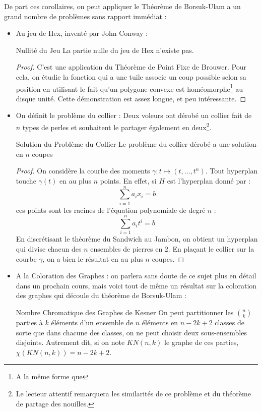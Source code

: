 \documentclass{cours}
\begin{document}
De part ces corollaires, on peut appliquer le Théorème de Borsuk-Ulam a un grand nombre de problèmes sans rapport immédiat\! :
\begin{itemize}
\item Au jeu de Hex, inventé par John Conway\! :
\begin{théorème}{Nullité du Jeu}{}
La partie nulle du jeu de Hex n'existe pas.
\end{théorème}
\begin{proof}
    C'est une application du Théorème de Point Fixe de Brouwer. Pour cela, on étudie la fonction qui a une tuile associe un coup possible selon sa position en utilisant le fait qu'un polygone convexe est homéomorphe\footnote{A la même forme que} au disque unité. Cette démonstration est assez longue, et peu intéressante.
\end{proof}
\item On définit le problème du collier\! : Deux voleurs ont dérobé un collier fait de $n$ types de perles et souhaitent le partager également en deux\footnote{Le lecteur attentif remarquera les similarités de ce problème et du théorème de partage des nouilles.}.
\begin{théorème}{Solution du Problème du Collier}{}
Le problème du collier dérobé a une solution en $n$ coupes
\end{théorème}
\begin{proof}
    On considère la courbe des moments $\gamma\! : t \mapsto \left(t, \ldots, t^{n}\right)$. Tout hyperplan touche $\gamma(t)$ en au plus $n$ points. En effet, si $H$ est l'hyperplan donné par\! :
    \[
        \sum_{i = 1}^{n} a_{i}x_{i} = b
    \]
    ces points sont les racines de l'équation polynomiale de degré $n$\! :
    \[
        \sum_{i = 1}^{n}a_{i}t^{i} = b
    \]
    En discrétisant le théorème du Sandwich au Jambon, on obtient un hyperplan qui divise chacun des $n$ ensembles de pierres en $2$. En plaçant le collier sur la courbe $\gamma$, on a bien le résultat en au plus $n$ coupes.
\end{proof}

\item A la Coloration des Graphes\! : on parlera sans doute de ce sujet plus en détail dans un prochain cours, mais voici tout de même un résultat sur la coloration des graphes qui découle du théorème de Borsuk-Ulam\! :
\begin{théorème}{Nombre Chromatique des Graphes de Kesner}{}
On peut partitionner les $\binom{n}{k}$ parties à $k$ éléments d'un ensemble de $n$ éléments en $n - 2k + 2$ classes de sorte que dans chacune des classes, on ne peut choisir deux sous-ensembles disjoints. Autrement dit, si on note $KN(n, k)$ le graphe de ces parties, $\chi\left(KN(n, k)\right) = n - 2k + 2$.
\end{théorème}
\end{itemize}
\end{document}
